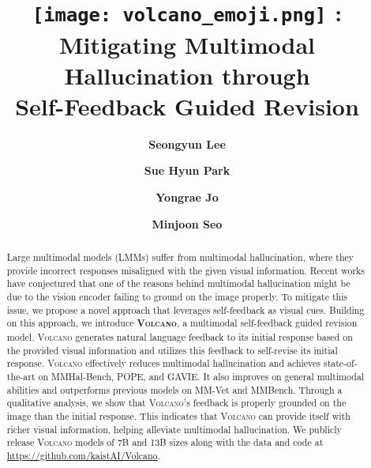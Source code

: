 \documentclass[11pt]{article}
\title{\texttt{[image: volcano\_emoji.png]} {\Ours}: Mitigating Multimodal Hallucination through \\ Self-Feedback Guided Revision}
\author[1,2\thanks{\hspace{0.15cm}Work done during internship at KAIST AI}]{\textbf{Seongyun Lee}}
\author[2]{\textbf{Sue Hyun Park}}
\author[3]{\textbf{Yongrae Jo}}
\author[2]{\textbf{Minjoon Seo}}
\affil[1]{Korea University}
\affil[2]{KAIST AI}
\affil[3]{LG AI Research \protect \3ex] \texttt{sy-lee@korea.ac.kr \{suehyunpark, minjoon\}@kaist.ac.kr yongrae.jo@lgresearch.ai}}
\newcommand{\Ours}{\textsc{Volcano}}
\begin{document}
\maketitle
\begin{abstract}
Large multimodal models (LMMs) suffer from multimodal hallucination, where they provide incorrect responses misaligned with the given visual information. Recent works have conjectured that one of the reasons behind multimodal hallucination might be due to the vision encoder failing to ground on the image properly. To mitigate this issue, we propose a novel approach that leverages self-feedback as visual cues. Building on this approach, we introduce \textbf{{\Ours}}, a multimodal self-feedback guided revision model. {\Ours} generates natural language feedback to its initial response based on the provided visual information and utilizes this feedback to self-revise its initial response. {\Ours} effectively reduces multimodal hallucination and achieves state-of-the-art on MMHal-Bench, POPE, and GAVIE. It also improves on general multimodal abilities and outperforms previous models on MM-Vet and MMBench. Through a qualitative analysis, we show that {\Ours}'s feedback is properly grounded on the image than the initial response. This indicates that {\Ours} can provide itself with richer visual information, helping alleviate multimodal hallucination. We publicly release {\Ours} models of 7B and 13B sizes along with the data and code at \href{https://github.com/kaistAI/Volcano}{https://github.com/kaistAI/Volcano}.
\end{abstract}
\end{document}
